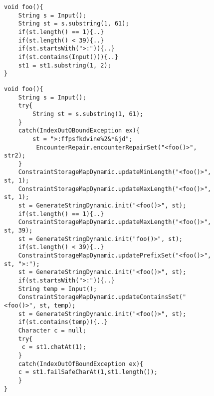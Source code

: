 

\lstset{language=Java, caption=Repairing strategy example, label = snippet:exCode1}
\begin{figure}[t]
\begin{lstlisting}
void foo(){
	String s = Input();
	String st = s.substring(1, 61);	
	if(st.length() == 1){..}
	if(st.length() < 39){..}
	if(st.startsWith(">:")){..}
	if(st.contains(Input())){..}
	st1 = st1.substring(1, 2);
}
\end{lstlisting}
\end{figure}

\lstset{language=Java, caption=Repairing strategy Instrumentation example, label = snippet:exCode2}
\begin{figure}[t]
\begin{lstlisting}
void foo(){
	String s = Input();
	try{
		String st = s.substring(1, 61);
	}
	catch(IndexOutOBoundException ex){
		st = ">:ffpsfkdvine%2&*&jd";
		 EncounterRepair.encounterRepairSet("<foo()>", str2);
	}
	ConstraintStorageMapDynamic.updateMinLength("<foo()>", st, 1);
	ConstraintStorageMapDynamic.updateMaxLength("<foo()>", st, 1);
	st = GenerateStringDynamic.init("<foo()>", st);	
	if(st.length() == 1){..}
	ConstraintStorageMapDynamic.updateMaxLength("<foo()>", st, 39);
	st = GenerateStringDynamic.init("foo()>", st);
	if(st.length() < 39){..}
	ConstraintStorageMapDynamic.updatePrefixSet("<foo()>", st, ">:");
	st = GenerateStringDynamic.init("<foo()>", st);
	if(st.startsWith(">:")){..}
	String temp = Input();
	ConstraintStorageMapDynamic.updateContainsSet("<foo()>", st, temp);
	st = GenerateStringDynamic.init("<foo()>", st);
	if(st.contains(temp)){..}
	Character c = null;
	try{
	 c = st1.chatAt(1);
	}
	catch(IndexOutOfBoundException ex){
	c = st1.failSafeCharAt(1,st1.length());
	}
}
\end{lstlisting}
\end{figure}

